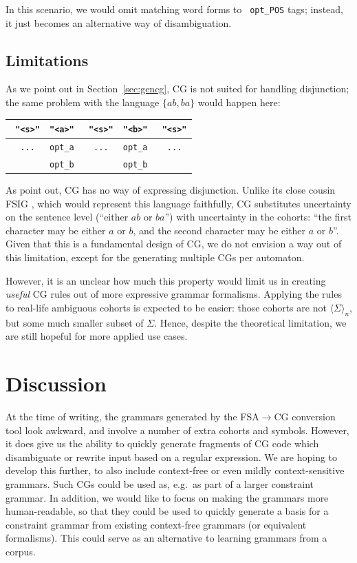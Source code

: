 \documentclass[11pt]{article}
\def\t#1{\texttt{#1}}
\def\h#1{{\tt \color{gray} #1}}
\def\swf{\h{"<s>"}}
\def\maxAmb#1{$\langle \Sigma \rangle_#1$}
\begin{document}
In this scenario, we would omit matching word forms to \t{\h{opt\_}POS} tags; 
instead, it just becomes an alternative way of disambiguation.


\subsection{Limitations}
As we point out in Section~\ref{sec:gencg}, CG is not suited for handling disjunction;
the same problem with the language $\{ab,ba\}$ would happen here:

\begin{table}[h]
  \centering\small
  \begin{tabular}{c|c|c|c|c}
    \swf    & \t{"<a>"}  & \swf    & \t{"<b>"}  & \swf    \\ \hline
    \h{...} & \t{opt\_a} & \h{...} & \t{opt\_a} & \h{...} \\ 
            & \t{opt\_b} &         & \t{opt\_b} &                   
  \end{tabular}
\end{table}

As  point out, CG has no way of expressing disjunction.
Unlike its close cousin FSIG \cite{koskenniemi90}, which would represent this
language faithfully, CG substitutes uncertainty on the sentence level (``either
$ab$ or $ba$'') with uncertainty in the cohorts: ``the first character may be
either $a$ or $b$, and the second character may be either $a$ or $b$''.
Given that this is a fundamental design of CG, we do not envision a way out of 
this limitation, except for the generating multiple CGs per automaton.

However, it is an unclear how much this property would limit us in creating 
\emph{useful} CG rules out of more expressive grammar formalisms.
Applying the rules to real-life ambiguous cohorts is expected to be easier:
those cohorts are not \maxAmb{n}, but some much smaller subset of $\Sigma$.
Hence, despite the theoretical limitation, we are still hopeful
for more applied use cases.


\section{Discussion}

At the time of writing, the grammars generated by the FSA$\rightarrow$CG
conversion tool look awkward, and involve a number of extra cohorts and symbols.
However, it does give us the ability to quickly generate fragments of CG code
which disambiguate or rewrite input based on a regular expression.
We are hoping to develop this further, to also include context-free or even
mildly context-sensitive grammars.
Such CGs could be used as, e.g.\ as part of a larger constraint grammar.
In addition, we would like to focus on making the grammars more human-readable,
so that they could be used to quickly generate a basis for a constraint grammar
from existing context-free grammars (or equivalent formalisms).
This could serve as an alternative to learning grammars from a corpus.
\end{document}
